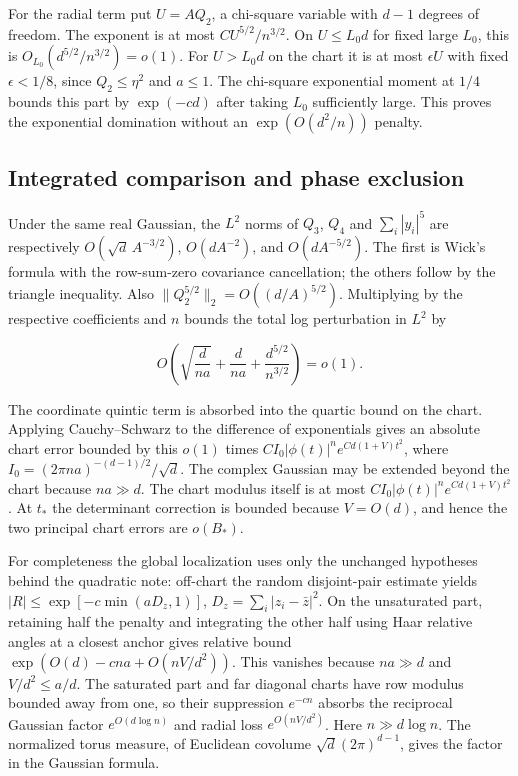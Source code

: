 For the radial term put $U=AQ_2$, a chi-square variable with $d-1$ degrees of freedom. The exponent is at most $C U^{5/2}/n^{3/2}$. On $U\le L_0 d$ for fixed large $L_0$, this is $O_{L_0}(d^{5/2}/n^{3/2})=o(1)$. For $U>L_0d$ on the chart it is at most $\epsilon U$ with fixed $\epsilon<1/8$, since $Q_2\le\eta^2$ and $a\le1$. The chi-square exponential moment at $1/4$ bounds this part by $\exp(-c d)$ after taking $L_0$ sufficiently large. This proves the exponential domination without an $\exp(O(d^2/n))$ penalty.

\subsection{Integrated comparison and phase exclusion}

Under the same real Gaussian, the $L^2$ norms of $Q_3$, $Q_4$ and $\sum_i|y_i|^5$ are respectively $O(\sqrt d\,A^{-3/2})$, $O(d A^{-2})$, and $O(d A^{-5/2})$. The first is Wick's formula with the row-sum-zero covariance cancellation; the others follow by the triangle inequality. Also $\|Q_2^{5/2}\|_2=O((d/A)^{5/2})$. Multiplying by the respective coefficients and $n$ bounds the total log perturbation in $L^2$ by

\begin{equation*}
O\!\left(\sqrt{\frac d{na}}+\frac d{na}+\frac{d^{5/2}}{n^{3/2}}\right)=o(1).
\end{equation*}

The coordinate quintic term is absorbed into the quartic bound on the chart. Applying Cauchy--Schwarz to the difference of exponentials gives an absolute chart error bounded by this $o(1)$ times $C I_0|\phi(t)|^n e^{Cd(1+V)t^2}$, where $I_0=(2\pi na)^{-(d-1)/2}/\sqrt d$. The complex Gaussian may be extended beyond the chart because $na\gg d$. The chart modulus itself is at most $C I_0|\phi(t)|^n e^{Cd(1+V)t^2}$. At $t_*$ the determinant correction is bounded because $V=O(d)$, and hence the two principal chart errors are $o(B_*)$.

For completeness the global localization uses only the unchanged hypotheses behind the quadratic note: off-chart the random disjoint-pair estimate yields $|R|\le\exp[-c\min(aD_z,1)]$, $D_z=\sum_i|z_i-\bar z|^2$. On the unsaturated part, retaining half the penalty and integrating the other half using Haar relative angles at a closest anchor gives relative bound $\exp(O(d)-cna+O(nV/d^2))$. This vanishes because $na\gg d$ and $V/d^2\le a/d$. The saturated part and far diagonal charts have row modulus bounded away from one, so their suppression $e^{-cn}$ absorbs the reciprocal Gaussian factor $e^{O(d\log n)}$ and radial loss $e^{O(nV/d^2)}$. Here $n\gg d\log n$. The normalized torus measure, of Euclidean covolume $\sqrt d(2\pi)^{d-1}$, gives the factor in the Gaussian formula.

